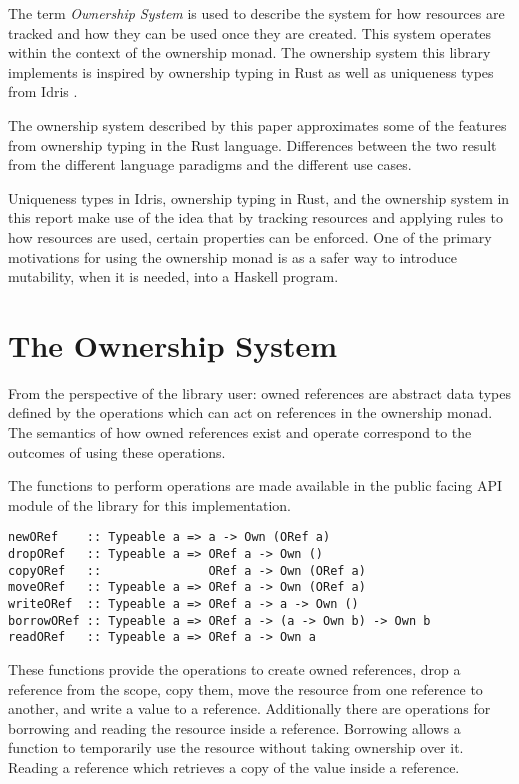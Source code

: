 \documentclass[onehalf,11pt]{beavtex}
\begin{document}
The term \textit{Ownership System} is used to describe the system for how
resources are tracked and how they can be used once they are created. This
system operates within the context of the ownership monad.
The ownership system this library implements is inspired by
ownership typing in Rust \cite{rust_book_ownership}
as well as uniqueness types from Idris \cite{idris_uniqueness_types}.

The ownership system described by this paper approximates some of the
features from ownership typing in the Rust language. Differences between
the two result from the different language paradigms and the different use
cases.

Uniqueness types in Idris, ownership typing in Rust, and the ownership system in
this report make use of the idea that by tracking resources and applying rules
to how resources are used, certain properties can be enforced.
One of the primary motivations for using the ownership monad is as a
safer way to introduce mutability, when it is needed, into a Haskell program.


\section{The Ownership System}

From the perspective of the library user: owned references are abstract
data types defined by the operations which can act on references in the
ownership monad.
The semantics of how owned references exist and operate correspond to the
outcomes of using these operations.

The functions to perform operations are made available in the public facing API
module of the library for this implementation.

\begin{verbatim}
newORef    :: Typeable a => a -> Own (ORef a)
dropORef   :: Typeable a => ORef a -> Own ()
copyORef   ::               ORef a -> Own (ORef a)
moveORef   :: Typeable a => ORef a -> Own (ORef a)
writeORef  :: Typeable a => ORef a -> a -> Own ()
borrowORef :: Typeable a => ORef a -> (a -> Own b) -> Own b
readORef   :: Typeable a => ORef a -> Own a
\end{verbatim}

These functions provide the operations to create owned references,
drop a reference from the scope, copy them, move the resource from one reference
to another,  and write a value to a reference.
Additionally there are operations for borrowing and reading the resource inside
a reference.
Borrowing allows a function to temporarily use the resource without taking
ownership over it. Reading a reference which retrieves a copy of the
value inside a reference.
\end{document}
